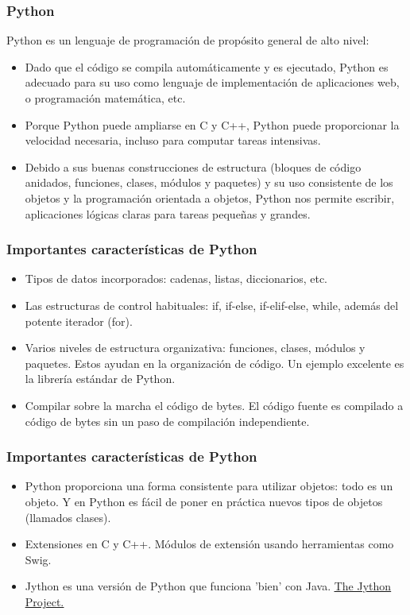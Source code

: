 \documentclass[10pt]{beamer}
\begin{document}
\begin{frame}[fragile]
\frametitle{Python}
Python es un lenguaje de programaci\'on de prop\'osito general de alto nivel:
\begin{itemize}
\item Dado que el c\'odigo se compila autom\'aticamente y es  ejecutado, Python es adecuado para su uso como lenguaje de implementaci\'on de aplicaciones web, o programaci\'on matem\'atica, etc.
\item Porque Python puede ampliarse en C y C++, Python puede proporcionar la velocidad necesaria, incluso para computar tareas intensivas.
\item Debido a sus buenas  construcciones de estructura  (bloques de c\'odigo anidados, funciones, clases, m\'odulos y paquetes) y su uso consistente de los objetos y la programaci\'on orientada a objetos, Python nos permite escribir, aplicaciones l\'ogicas claras para tareas peque\~nas y grandes.
\end{itemize}
\end{frame}

\begin{frame}[fragile]
\frametitle{Importantes caracter\'isticas de Python}

\begin{itemize}
\item Tipos de datos incorporados: cadenas, listas, diccionarios, etc.
\item Las estructuras de control habituales: if, if-else, if-elif-else, while, adem\'as del potente iterador (for).
\item Varios niveles de estructura organizativa: funciones, clases, m\'odulos y paquetes. Estos ayudan en la organizaci\'on de c\'odigo. Un ejemplo excelente  es la librer\'ia est\'andar de Python.
\item Compilar sobre la marcha el  c\'odigo de bytes. El c\'odigo fuente es compilado a c\'odigo de bytes sin un paso de compilaci\'on independiente.
\end{itemize}
\end{frame}

\begin{frame}[fragile]
\frametitle{Importantes caracter\'isticas de Python}
\begin{itemize}
\item Python proporciona una forma consistente para utilizar objetos: todo es un objeto. Y en Python es f\'acil de poner en pr\'actica nuevos tipos de objetos (llamados clases).
\item Extensiones en C y C++. M\'odulos de extensi\'on usando herramientas como Swig.
\item Jython es una versi\'on de Python que funciona 'bien' con Java. \href{http://www.jython.org/Project/}{\underline{The Jython Project.}} 
\end{itemize}
\end{frame}
\end{document}
